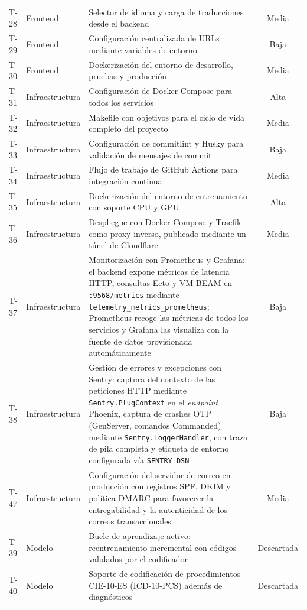 \begin{center}
\begin{longtable}{llP{7.5cm}c}
T-28 & Frontend & Selector de idioma y carga de traducciones desde el backend & Media \\
T-29 & Frontend & Configuración centralizada de URLs mediante variables de entorno & Baja \\
T-30 & Frontend & Dockerización del entorno de desarrollo, pruebas y producción & Media \\
\hline
T-31 & Infraestructura & Configuración de Docker Compose para todos los servicios & Alta \\
T-32 & Infraestructura & Makefile con objetivos para el ciclo de vida completo del proyecto & Media \\
T-33 & Infraestructura & Configuración de commitlint y Husky para validación de mensajes de commit & Baja \\
T-34 & Infraestructura & Flujo de trabajo de GitHub Actions para integración continua & Media \\
T-35 & Infraestructura & Dockerización del entorno de entrenamiento con soporte CPU y GPU & Alta \\
T-36 & Infraestructura & Despliegue con Docker Compose y Traefik como proxy inverso, publicado mediante un túnel de Cloudflare & Media \\
T-37 & Infraestructura & Monitorización con Prometheus y Grafana: el backend expone métricas de latencia HTTP, consultas Ecto y VM BEAM en \texttt{:9568/metrics} mediante \texttt{telemetry\_metrics\_prometheus}; Prometheus recoge las métricas de todos los servicios y Grafana las visualiza con la fuente de datos provisionada automáticamente & Baja \\
T-38 & Infraestructura & Gestión de errores y excepciones con Sentry: captura del contexto de las peticiones HTTP mediante \texttt{Sentry.PlugContext} en el \emph{endpoint} Phoenix, captura de crashes OTP (GenServer, comandos Commanded) mediante \texttt{Sentry.LoggerHandler}, con traza de pila completa y etiqueta de entorno configurada vía \texttt{SENTRY\_DSN} & Baja \\
T-47 & Infraestructura & Configuración del servidor de correo en producción con registros SPF, DKIM y política DMARC para favorecer la entregabilidad y la autenticidad de los correos transaccionales & Media \\
\hline
T-39 & Modelo & Bucle de aprendizaje activo: reentrenamiento incremental con códigos validados por el codificador & Descartada \\
T-40 & Modelo & Soporte de codificación de procedimientos CIE-10-ES (ICD-10-PCS) además de diagnósticos & Descartada \\

\end{longtable}
\end{center}
